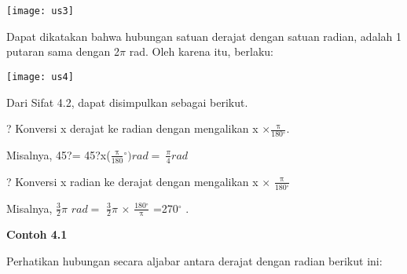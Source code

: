 \documentclass[11pt,fleqn]{book} %
\begin{document}
\texttt{[image: us3]}

Dapat dikatakan bahwa hubungan satuan derajat dengan satuan radian, adalah 1 putaran sama dengan 2$\pi$ rad. Oleh karena itu, berlaku:

\texttt{[image: us4]}

Dari Sifat 4.2, dapat disimpulkan sebagai berikut. 

? Konversi x derajat ke radian dengan mengalikan x $\times$$\frac{\mathrm{\pi }}{180{}^\circ }$.

Misalnya, 45?= 45?x($\frac{\mathrm{\pi }}{\mathrm{180}}\mathrm{{}^\circ )}rad=\ \frac{\pi }{4}rad$

? Konversi x radian ke derajat dengan mengalikan x $\times$ $\frac{\mathrm{\pi }}{180{}^\circ }$

Misalnya, $\frac{3}{2}$$\pi$ $rad=$ $\frac{3}{2}$$\pi$ $\times$ $\frac{180{}^\circ }{\mathrm{\pi }}$ =270${}^\circ $ .

\textbf{Contoh 4.1}

Perhatikan hubungan secara aljabar antara derajat dengan radian berikut ini:

\end{document}
